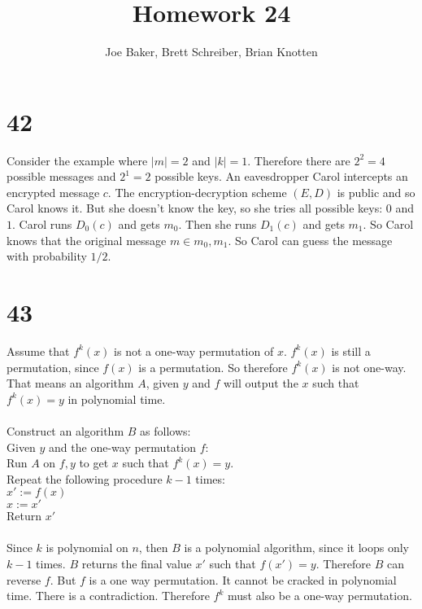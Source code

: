 \documentclass[letterpaper,notitlepage,twoside]{article}
\newcommand\tab[1][1cm]{\hspace*{#1}} %
\begin{document}
\title{Homework 24}
\author{Joe Baker, Brett Schreiber, Brian Knotten}
\maketitle

\section*{42}
Consider the example where $|m| = 2$ and $|k| = 1$. Therefore there are $2^2 = 4$ possible messages and $2^1 = 2$ possible keys. An eavesdropper Carol intercepts an encrypted message $c$. The encryption-decryption scheme $(E, D)$ is public and so Carol knows it. But she doesn't know the key, so she tries all possible keys: $0$ and $1$. Carol runs $D_0(c)$ and gets $m_0$. Then she runs $D_1(c)$ and gets $m_1$. So Carol knows that the original message $m \in {m_0, m_1}$. So Carol can guess the message with probability $1/2$.


\section*{43}
Assume that $f^k(x)$ is not a one-way permutation of $x$. $f^k(x)$ is still a permutation, since $f(x)$ is a permutation. So therefore $f^k(x)$ is not one-way. That means an algorithm $A$, given $y$ and $f$ will output the $x$ such that $f^k(x) = y$ in polynomial time. \\\\
Construct an algorithm $B$ as follows: \\
Given $y$ and the one-way permutation $f$: \\
\tab Run $A$ on $f, y$ to get $x$ such that $f^k(x) = y$. \\
\tab Repeat the following procedure $k - 1$ times: \\
\tab\tab $x' := f(x)$ \\
\tab\tab $x := x'$ \\
\tab Return $x'$ \\\\
Since $k$ is polynomial on $n$, then $B$ is a polynomial algorithm, since it loops only $k - 1$ times. $B$ returns the final value $x'$ such that $f(x') = y$. Therefore $B$ can reverse $f$. But $f$ is a one way permutation. It cannot be cracked in polynomial time. There is a contradiction. Therefore $f^k$ must also be a one-way permutation.
\end{document}
